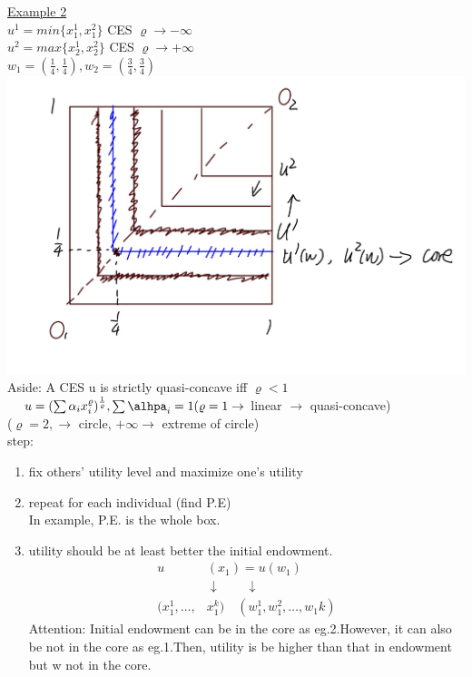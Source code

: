 \documentclass[letterpaper,13pt,single,pdftex]{scrartcl}
\begin{document}
\underline{Example 2}\\
$u^1 = min\{x_1^1,x_1^2\}$ CES $\varrho \rightarrow -\infty$\\
$u^2 = max\{x_2^1,x_2^2\}$ CES $\varrho \rightarrow +\infty$\\
$w_1 = (\frac{1}{4}, \frac{1}{4}), w_2= (\frac{3}{4},\frac{3}{4})$\\
\includegraphics[scale = 0.2]{ezample2.jpg}\\
Aside: A CES u is strictly quasi-concave iff $\varrho < 1$\\
    \quad $ \,\quad u =(\sum \alpha_ix_i^\varrho)^{\frac{1}{\varrho}}, \sum\alhpa_i=1(\varrho = 1\rightarrow$ linear $\rightarrow$ quasi-concave)\\
    ($\varrho = 2, \rightarrow$ circle, $+\infty \rightarrow$ extreme of circle)\\
step:
\begin{enumerate}
    \item fix others' utility level and maximize one's utility
    \item repeat for each individual (find P.E)\\
        In example, P.E. is the whole box.
        \item utility should be at least better the initial endowment.  
        \begin{align*}
         u&(x_1) = u(w_1)  \\
         &\downarrow \qquad \downarrow\\
         (x_1^1, \dots, &x_1^k)\quad  (w_1^1,w_1^2,\dots,w_1k)
        \end{align*}
        Attention: Initial endowment can be in the core as eg.2.However, it can also be not in the core as eg.1.Then, utility is be higher than that in endowment but w not in the core. 
\end{enumerate} 
\end{document}
